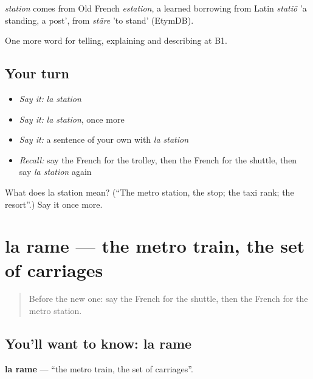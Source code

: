 \begin{cousinweb}
\emph{station} comes from Old French \emph{estation}, a learned borrowing from Latin \emph{statiō} 'a standing, a post', from \emph{stāre} 'to stand' (EtymDB).
\end{cousinweb}

\begin{grammarlens}[title={What you've built}]
One more word for telling, explaining and describing at B1.
\end{grammarlens}

\subsection*{Your turn}
\begin{itemize}
\raggedright
  \item \emph{Say it:} \emph{la station}
  \item \emph{Say it:} \emph{la station}, once more
  \item \emph{Say it:} a sentence of your own with \emph{la station}
  \item \emph{Recall:} say the French for the trolley, then the French for the shuttle, then say \emph{la station} again
\end{itemize}

\begin{tcolorbox}[breakable,colback=teal!4,colframe=teal!35!black,title={Before you move on}]
What does la station mean? (\textquotedblleft{}The metro station, the stop; the taxi rank; the resort\textquotedblright{}.) Say it once more.
\end{tcolorbox}
\section[la rame]{la rame — the metro train, the set of carriages}

\label{lesson:FR-C415-rame}



\begin{quote}
Before the new one: say the French for the shuttle, then the French for the metro station.
\end{quote}

\subsection*{You'll want to know: la rame}
\textbf{la rame} — \textquotedblleft{}the metro train, the set of carriages\textquotedblright{}.


